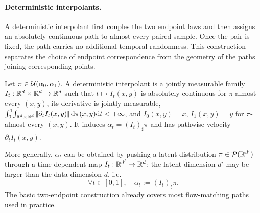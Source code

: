 
\paragraph{Deterministic interpolants.}

A deterministic interpolant first couples the two endpoint laws and then assigns an absolutely continuous path to almost every paired sample. Once the pair is fixed, the path carries no additional temporal randomness. This construction separates the choice of endpoint correspondence from the geometry of the paths joining corresponding points.
\begin{defn}\label{def-deterministic-interpolant}
Let \(\pi\in\mathcal{U}(\alpha_0,\alpha_1)\). A deterministic interpolant is a jointly measurable family \(I_t:\mathbb{R}^d\times\mathbb{R}^d\to\mathbb{R}^d\) such that \(t\mapsto I_t(x,y)\) is absolutely continuous for \(\pi\)-almost every \((x,y)\), its derivative is jointly measurable, \(\int_0^1\!\int_{\mathbb{R}^d\times\mathbb{R}^d}|\!| \partial_t I_t(x,y) |\!|\,\mathrm{d}\pi(x,y)\mathrm{d} t<+\infty\), and \(I_0(x,y)=x\), \(I_1(x,y)=y\) for \(\pi\)-almost every \((x,y)\).
It induces \(\alpha_t=(I_t)_\sharp\pi\) and has pathwise velocity \(\partial_t I_t(x,y)\).
\end{defn}
More generally, $\alpha_t$ can be obtained by pushing a latent distribution $\pi \in \mathcal{P}(\mathbb{R}^{d'})$ through a time-dependent map $I_t : \mathbb{R}^{d'} \to \mathbb{R}^d$; the latent dimension $d'$ may be larger than the data dimension $d$, i.e.
\begin{equation}\label{eq:interp-coupling}
	\forall t \in [0,1], \quad \alpha_t := (I_t)_\sharp \pi.
\end{equation}
The basic two-endpoint construction already covers most flow-matching paths used in practice.

